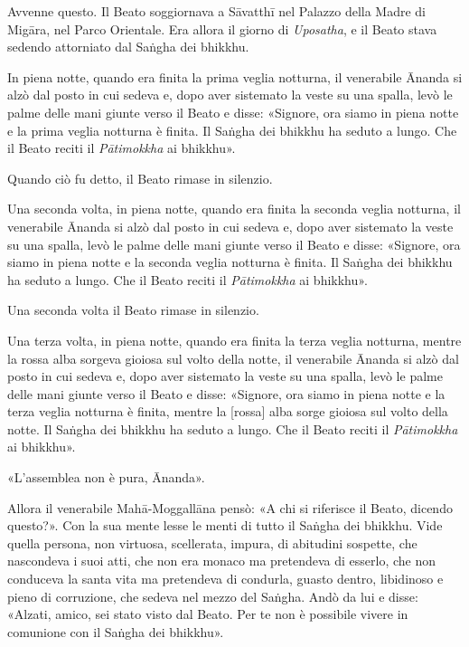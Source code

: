 
Avvenne questo. Il Beato soggiornava a Sāvatthī nel Palazzo della Madre di
Migāra, nel Parco Orientale. Era allora il giorno di \emph{Uposatha}, e il Beato
stava sedendo attorniato dal Saṅgha dei bhikkhu.

In piena notte, quando era finita la prima veglia notturna, il venerabile Ānanda
si alzò dal posto in cui sedeva e, dopo aver sistemato la veste su una spalla,
levò le palme delle mani giunte verso il Beato e disse: «Signore, ora siamo in
piena notte e la prima veglia notturna è finita. Il Saṅgha dei bhikkhu ha seduto
a lungo. Che il Beato reciti il \emph{Pātimokkha} ai bhikkhu».

Quando ciò fu detto, il Beato rimase in silenzio.

Una seconda volta, in piena notte, quando era finita la seconda veglia notturna,
il venerabile Ānanda si alzò dal posto in cui sedeva e, dopo aver sistemato la
veste su una spalla, levò le palme delle mani giunte verso il Beato e disse:
«Signore, ora siamo in piena notte e la seconda veglia notturna è finita. Il
Saṅgha dei bhikkhu ha seduto a lungo. Che il Beato reciti il \emph{Pātimokkha}
ai bhikkhu».

Una seconda volta il Beato rimase in silenzio.

Una terza volta, in piena notte, quando era finita la terza veglia notturna,
mentre la rossa alba sorgeva gioiosa sul volto della notte, il venerabile Ānanda
si alzò dal posto in cui sedeva e, dopo aver sistemato la veste su una spalla,
levò le palme delle mani giunte verso il Beato e disse: «Signore, ora siamo in
piena notte e la terza veglia notturna è finita, mentre la [rossa] alba sorge
gioiosa sul volto della notte. Il Saṅgha dei bhikkhu ha seduto a lungo. Che il
Beato reciti il \emph{Pātimokkha} ai bhikkhu».

«L’assemblea non è pura, Ānanda».

Allora il venerabile Mahā-Moggallāna pensò: «A chi si riferisce il Beato,
dicendo questo?». Con la sua mente lesse le menti di tutto il Saṅgha dei
bhikkhu. Vide quella persona, non virtuosa, scellerata, impura, di abitudini
sospette, che nascondeva i suoi atti, che non era monaco ma pretendeva di
esserlo, che non conduceva la santa vita ma pretendeva di condurla, guasto
dentro, libidinoso e pieno di corruzione, che sedeva nel mezzo del Saṅgha. Andò
da lui e disse: «Alzati, amico, sei stato visto dal Beato. Per te non è
possibile vivere in comunione con il Saṅgha dei bhikkhu».

